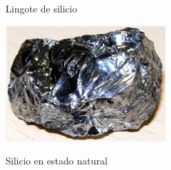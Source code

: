 \documentclass[10pt,t,aspectratio=169]{beamer}
\begin{document}
\begin{frame}[t]
\begin{columns}
\begin{column}{0.25\textwidth}
      \small{Lingote de silicio}
      
      \includegraphics[width=\textwidth]{./figures/silicio-puro.png}

      \small{Silicio en estado natural}
      
    \end{column}
    
  \end{columns}
  
\end{frame}
\end{document}

